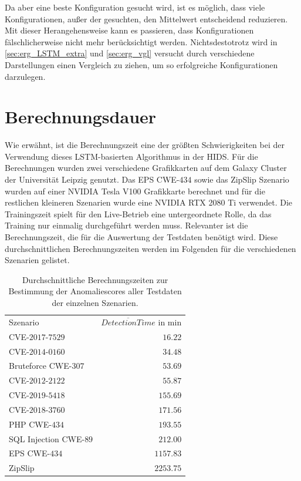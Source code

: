     Da aber eine beste Konfiguration gesucht wird, ist es möglich, dass viele Konfigurationen, außer der gesuchten, den Mittelwert entscheidend reduzieren.
    Mit dieser Herangehensweise kann es passieren, dass Konfigurationen fälschlicherweise nicht mehr berücksichtigt werden.
    Nichtsdestotrotz wird in \autoref{sec:erg_LSTM_extra} und \autoref{sec:erg_vgl} versucht durch verschiedene Darstellungen einen Vergleich zu ziehen, um so erfolgreiche Konfigurationen darzulegen.

\section{Berechnungsdauer}\label{sec:erg_time}
    Wie erwähnt, ist die Berechnungszeit eine der größten Schwierigkeiten bei der Verwendung dieses \ac{LSTM}-basierten Algorithmus in der \ac{HIDS}.
    Für die Berechnungen wurden zwei verschiedene Grafikkarten auf dem Galaxy Cluster der Universität Leipzig genutzt.
    Das EPS CWE-$434$ sowie das ZipSlip Szenario wurden auf einer NVIDIA Tesla V100 Grafikkarte berechnet und für die restlichen kleineren Szenarien wurde eine NVIDIA RTX 2080 Ti verwendet.
    Die Trainingszeit spielt für den Live-Betrieb eine untergeordnete Rolle, da das Training nur einmalig durchgeführt werden muss.
    Relevanter ist die Berechnungszeit, die für die Auswertung der Testdaten benötigt wird.
    Diese durchschnittlichen Berechnungszeiten werden im Folgenden für die verschiedenen Szenarien gelistet.\par\medskip
    \begin{table}[ht]
        \centering
        \begin{tabular}{lr}
            \hline
            \rowcolor{GruvGray!36}
            \multicolumn{2}{c}{Berechnungszeiten der verschiedenen Szenarien}\\
            \toprule
            Szenario &  $\overline{Detection Time}$ in min\\
            \midrule
            \rowcolor{GruvGray!16}
            CVE-$2017$-$7529$ & $16.22$ \\
            CVE-$2014$-$0160$ & $34.48$ \\
            \rowcolor{GruvGray!16}
            Bruteforce CWE-$307$ & $53.69$ \\
            CVE-$2012$-$2122$ & $55.87$ \\
            \rowcolor{GruvGray!16}
            CVE-$2019$-$5418$ & $155.69$ \\
            CVE-$2018$-$3760$ & $171.56$ \\
            \rowcolor{GruvGray!16}
            PHP CWE-$434$ & $193.55$ \\
            SQL Injection CWE-$89$ & $212.00$ \\
            \rowcolor{GruvGray!16}
            EPS CWE-$434$ & $1157.83$ \\	
            ZipSlip & $2253.75$ \\	
            \hline
        \end{tabular}
        \caption[Ergebnisse Berechnungsdauer Szenarien]{Durchschnittliche Berechnungszeiten zur Bestimmung der Anomaliescores aller Testdaten der einzelnen Szenarien.}
        \label{tab:LSTM_erg_time}
    \end{table}
